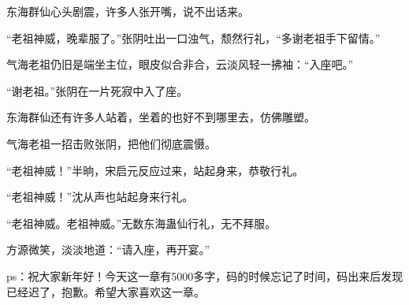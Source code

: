 \begin{this_body}
东海群仙心头剧震，许多人张开嘴，说不出话来。

“老祖神威，晚辈服了。”张阴吐出一口浊气，颓然行礼，“多谢老祖手下留情。”

气海老祖仍旧是端坐主位，眼皮似合非合，云淡风轻一拂袖：“入座吧。”

“谢老祖。”张阴在一片死寂中入了座。

东海群仙还有许多人站着，坐着的也好不到哪里去，仿佛雕塑。

气海老祖一招击败张阴，把他们彻底震慑。

“老祖神威！”半晌，宋启元反应过来，站起身来，恭敬行礼。

“老祖神威！”沈从声也站起身来行礼。

“老祖神威。老祖神威。”无数东海蛊仙行礼，无不拜服。

方源微笑，淡淡地道：“请入座，再开宴。”

ps：祝大家新年好！今天这一章有5000多字，码的时候忘记了时间，码出来后发现已经迟了，抱歉。希望大家喜欢这一章。

\end{this_body}

